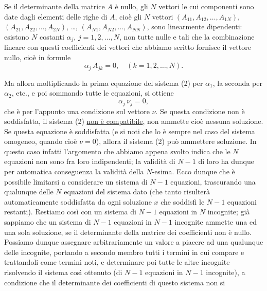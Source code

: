 \documentclass[11pt, a4paper]{book}
\numberwithin{equation}{section}
\begin{document}

Se il determinante della matrice $A$ è nullo, gli $N$ vettori le cui
componenti sono date dagli elementi delle righe di $A$, cioè gli $N$
vettori $(A_{11}, A_{12}, \ldots, A_{1N})$, $(A_{21}, A_{22}, \ldots,
A_{2N})$, \ldots, $(A_{N1}, A_{N2}, \ldots, A_{NN})$, sono linearmente
dipendenti: esistono $N$ costanti $\alpha_j$, $j = 1, 2, \ldots, N$, non
tutte nulle e tali che la combinazione lineare con questi coefficienti dei
vettori che abbiamo scritto fornisce il vettore nullo, cioè in formule
\begin{equation}
\alpha_j\, A_{jk} = 0, \quad (k = 1, 2, \ldots, N).
\end{equation}

Ma allora moltiplicando la prima equazione del sistema (2) per $\alpha_1$,
la seconda per $\alpha_2$, etc., e poi sommando tutte le equazioni, si
ottiene
\begin{equation}
\alpha_j\, \nu_j = 0,
\end{equation}
che è per l'appunto una condizione sul vettore $\nu$. Se questa condizione
non è soddisfatta, il sistema (2) \uline{non è compatibile}, non
ammette cioè nessuna soluzione. Se questa equazione è soddisfatta (e si
noti che lo è sempre nel caso del sistema omogeneo, quando cioè $\nu = 0$),
allora il sistema (2) può ammettere soluzione. In questo caso infatti
l'argomento che abbiamo appena svolto indica che le $N$ equazioni non sono
fra loro indipendenti; la validità di $N-1$ di loro ha dunque per automatica
conseguenza la validità della $N$-esima. Ecco dunque che è possibile
limitarsi a considerare un sistema di $N-1$ equazioni, trascurando una
qualunque delle $N$ equazioni del sistema dato (che tanto risulterà
automaticamente soddisfatta da ogni soluzione $x$ che soddisfi le $N-1$
equazioni restanti). Restiamo così con un sistema di $N-1$ equazioni in $N$
incognite; già sappiamo che un sistema di $N-1$ equazioni in $N-1$%
incognite ammette una ed una sola soluzione, se il determinante della
matrice dei coefficienti non è nullo. Possiamo dunque assegnare
arbitrariamente un valore a piacere ad una qualunque delle incognite,
portando a secondo membro tutti i termini in cui compare e trattandoli come
termini noti, e determinare poi tutte le altre incognite risolvendo il
sistema così ottenuto (di $N-1$ equazioni in $N-1$ incognite), a
condizione che il determinante dei coefficienti di questo sistema non si
\end{document}
